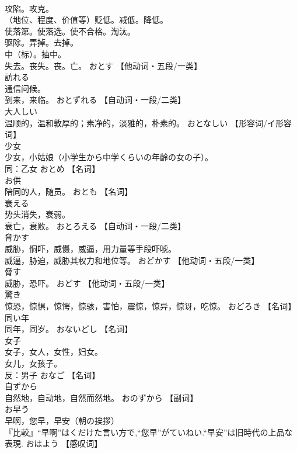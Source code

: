 \documentclass[8pt]{extreport}
\begin{document}
\begin{CJK}{UTF8}{min}
\\	攻陷。攻克。 
\\	（地位、程度、价值等）贬低。减低。降低。 
\\	使落第。使落选。使不合格。淘汰。 
\\	驱除。弄掉。去掉。 
\\	中（标）。抽中。 
\\	失去。丧失。丧。亡。	おとす		【他动词・五段/一类】
\\	訪れる	
\\	通信问候。 
\\	到来，来临。	おとずれる		【自动词・一段/二类】
\\	大人しい	
\\	温顺的，温和敦厚的；素净的，淡雅的，朴素的。	おとなしい		【形容词/イ形容词】
\\	少女	
\\	少女，小姑娘（小学生から中学くらいの年齡の女の子）。 
\\	同：乙女	おとめ		【名词】
\\	お供	
\\	陪同的人，随员。	おとも		【名词】
\\	衰える	
\\	势头消失，衰弱。 
\\	衰亡，衰败。	おとろえる		【自动词・一段/二类】
\\	脅かす	
\\	威胁，恫吓，威慑，威逼，用力量等手段吓唬。 
\\	威逼，胁迫，威胁其权力和地位等。	おどかす		【他动词・五段/一类】
\\	脅す	
\\	威胁，恐吓。	おどす		【他动词・五段/一类】
\\	驚き	
\\	惊恐，惊惧，惊愕，惊骇，害怕，震惊，惊异，惊讶，吃惊。	おどろき		【名词】
\\	同い年	
\\	同年，同岁。	おないどし		【名词】
\\	女子	
\\	女子，女人，女性，妇女。 
\\	女儿，女孩子。 
\\	反：男子	おなご		【名词】
\\	自ずから	
\\	自然地，自动地，自然而然地。	おのずから		【副词】
\\	お早う	
\\	早啊，您早，早安（朝の挨拶） 
\\	『比較』“早啊”はくだけた言い方で,“您早”がていねい.“早安”は旧時代の上品な表現.	おはよう		【感叹词】

\end{CJK}
\end{document}

